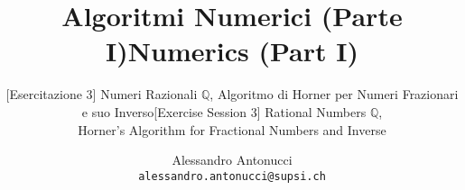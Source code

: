 \documentclass[professionalfonts]{beamer}
\title{Algoritmi Numerici (Parte I)}
\subtitle{[Esercitazione 3] Numeri Razionali  $\mathbb{Q}$, Algoritmo di Horner per Numeri Frazionari e suo Inverso}
\title{Numerics (Part I)}
\subtitle{[Exercise Session 3] Rational Numbers $\mathbb{Q}$,\\Horner's Algorithm for Fractional Numbers and Inverse}
\date{}
\author{Alessandro Antonucci\\{\tt alessandro.antonucci@supsi.ch}}
\newif\ifanswers
\begin{document}
\maketitle
\begin{comment}
\frame{\frametitle{\ifanswers I Numeri Razionali e la Divisione\else Rational Numbers and Division \fi}
\setstretch{1.4}
\begin{itemize}
\ifanswers
\item Moltiplicazione \`e addizione iterata (col segno per interi)
\else
\item Multiplication as an iterated sum (signed for integers)
\fi
\ifanswers
\item \evi{Divisione} operazione inversa alla moltiplicazione
\else
\item \evi{Division}? Inverse multiplication!
\fi
\ifanswers
\item L'insieme degli interi non \`e chiuso rispetto alla divisione
$a,b\in\mathbb{Z}$ $\Rightarrow$ $\mathrm{DIVISIONE}(a,b) \in \mathbb{Z}$ solo se $|a|$ multiplo di $|b|$
\else
\item Set of integers is not closed wrt division
$a,b\in\mathbb{Z}$ $\Rightarrow$ $\mathrm{DIVISION}(a,b) \in \mathbb{Z}$ if and only if $|a|$ multiple of $|b|$
\fi
\ifanswers
\item Soluzione? Allargare l'insieme definendo $a/b$
\else
\item Key? Increase the set and define new number $a/b$
\fi
\ifanswers
\item L'insieme allargato $\mathbb{Q}$ si chiama dei numeri \evi{razionali}
\else
\item Larger set is $\mathbb{Q}$: \evi{rational} numbers
\fi
\ifanswers
\item I razionali si esprimono com rapporti di numeri interi (primi fra loro, $a/b$ e $(ka)/(kb)$ sono lo stesso numero)
\else
\item Rational numbers are ratios of integer number (note $a/b$ and $(ka)/(kb)$ are the same number)

\fi
\end{itemize}}




\end{comment}
\end{document}
